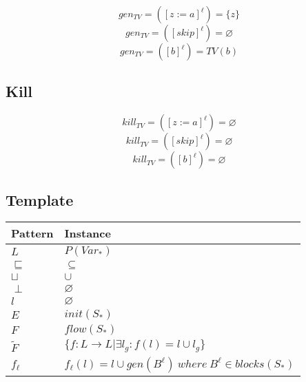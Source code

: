 \documentclass[11pt,a4paper,fleqn]{article}
\begin{document}
   \begin{equation}
      gen_{TV}=([z:=a]^{\ell})=\{z\}
   \end{equation}
   \begin{equation}
      gen_{TV}=([skip]^{\ell})=\varnothing
   \end{equation}
   \begin{equation}
      gen_{TV}=([b]^{\ell})=TV(b)
   \end{equation}

   \subsection{Kill}

   \begin{equation}
      kill_{TV}=([z:=a]^{\ell})=\varnothing
   \end{equation}
   \begin{equation}
      kill_{TV}=([skip]^{\ell})=\varnothing
   \end{equation}
   \begin{equation}
      kill_{TV}=([b]^{\ell})=\varnothing
   \end{equation}

   \subsection{Template}

   \begin{tabularx}{\linewidth}{| l | X |}
      \hline
      \textbf{Pattern} & \textbf{Instance} \\
      \hline\hline
      \( L \)  & \( P(Var_*) \) \\
      \hline
      \( \sqsubseteq \)  & \( \subseteq \) \\
      \hline
      \( \sqcup \)  & \( \cup \) \\
      \hline
      \( \perp \)  & \( \varnothing \) \\
      \hline
      \( l \)  & \( \varnothing \) \\
      \hline
      \( E \)  & \( init(S_*) \) \\
      \hline
      \( F \)  & \( flow(S_*) \) \\
      \hline
      \( \tilde{F} \)  & \( \{f : L \rightarrow L | \exists l_g : f(l) = l \cup l_g \} \) \\
      \hline
      \( f_{\ell} \)  & \( f_{\ell}(l) = l \cup gen(B^{\ell}) \ where \ B^{\ell} \in blocks (S_*) \) \\
      \hline
   \end{tabularx}
\end{document}
